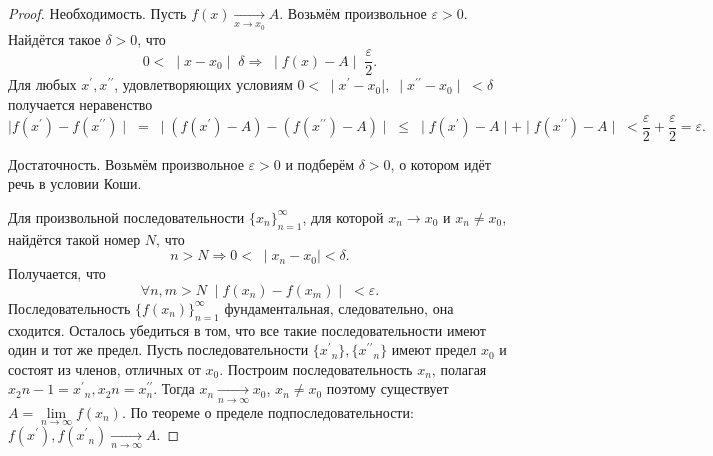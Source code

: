 \documentclass{article}
\begin{document}
\begin{proof}
Необходимость. Пусть $f(x) \xrightarrow[x \rightarrow x_0]{} A$.
Возьмём произвольное $\varepsilon > 0$. Найдётся такое $\delta > 0$, что
$$0 < \; \mid x - x_0 \mid \; \delta \Rightarrow \; \mid f(x) - A \mid \; \frac{\varepsilon}{2}.$$
Для любых $x^\prime, x^{\prime\prime}$, удовлетворяющих условиям $0 < \; \mid x^\prime - x_0 \mid, \; \mid x^{\prime\prime} - x_0 \mid \; < \delta$ получается неравенство
$$\mid f(x^\prime) - f(x^{\prime\prime}) \mid \; = \; \mid \left(f(x^\prime) - A\right) - \left(f(x^{\prime\prime}) - A\right) \mid \; \leq \; \mid f(x^\prime) - A \mid + \mid f(x^{\prime\prime}) - A \mid \; < \frac{\varepsilon}{2} + \frac{\varepsilon}{2} = \varepsilon.$$

Достаточность. Возьмём произвольное $\varepsilon > 0$ и подберём $\delta > 0$, о котором идёт речь в условии Коши.

Для произвольной последовательности $\{x_n\}^{\infty}_{n=1}$, для которой $x_n \rightarrow x_0$ и $x_n \neq x_0$, найдётся такой номер $N$, что
$$n > N \Rightarrow 0 < \; \mid x_n - x_0 \mid < \delta.$$
Получается, что
$$\forall n, m > N \; \mid f(x_n) - f(x_m) \mid \; < \varepsilon.$$
Последовательность $\{f(x_n)\}_{n=1}^{\infty}$ фундаментальная, следовательно, она сходится. Осталось убедиться в том, что все такие последовательности имеют один и тот же предел. Пусть последовательности $\{{x^\prime}_n\}, \{{x^{\prime\prime}}_n\}$ имеют предел $x_0$ и состоят из членов, отличных от $x_0$. Построим последовательность ${x_n}$, полагая $x_2n-1 = {x^\prime}_n, x_2n = x^{\prime\prime}_n$. Тогда $x_n \xrightarrow[n \rightarrow \infty]{} x_0$, $x_n \neq x_0$ поэтому существует $A=\lim\limits_{n\rightarrow \infty} f(x_n)$.
По теореме о пределе подпоследовательности: $f(x^\prime), f({x^\prime}_n) \xrightarrow[n \rightarrow \infty]{} A$.
\end{proof}
\end{document}
